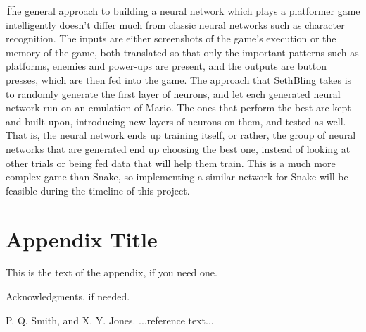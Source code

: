 \documentclass[preprint]{sigplanconf}
\begin{document}
\t The general approach to building a neural network which plays a platformer game intelligently doesn't differ much from classic neural networks such as character recognition. The inputs are either screenshots of the game's execution or the memory of the game, both translated so that only the important patterns such as platforms, enemies and power-ups are present, and the outputs are button presses, which are then fed into the game. The approach that SethBling takes is to randomly generate the first layer of neurons, and let each generated neural network run on an emulation of Mario. The ones that perform the best are kept and built upon, introducing new layers of neurons on them, and tested as well. That is, the neural network ends up training itself, or rather, the group of neural networks that are generated end up choosing the best one, instead of looking at other trials or being fed data that will help them train. This is a much more complex game than Snake, so implementing a similar network for Snake will be feasible during the timeline of this project.


\appendix
\section{Appendix Title}

This is the text of the appendix, if you need one.

\acks

Acknowledgments, if needed.





\begin{thebibliography}{}
\softraggedright

P. Q. Smith, and X. Y. Jones. ...reference text...

\end{thebibliography}
\end{document}

